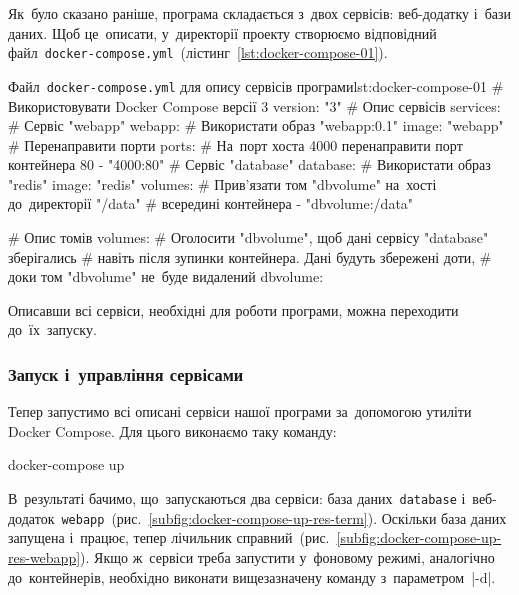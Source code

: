\documentclass[
	a4paper,
	oneside,
	BCOR = 10mm,
	DIV = 12,
	12pt,
	headings = normal,
]{scrartcl}
\newcommand{\filename}[1]{\texttt{#1}}
\newcommand{\progname}[1]{\texttt{#1}}
\begin{document}
					Як~було сказано раніше, програма складається з~двох сервісів: веб-додатку і~бази даних. Щоб це~описати, у~директорії проекту створюємо відповідний файл~\filename{\textenglish{docker-compose.yml}}~(лістинг~\ref{lst:docker-compose-01}).

					\begin{listingdockercompose}{Файл~\filename{\textenglish{docker-compose.yml}} для опису сервісів програми}{lst:docker-compose-01}
            # Використовувати Docker Compose версії 3
            version: "3"
            # Опис сервісів
            services:
              # Сервіс "webapp"
              webapp:
                # Використати образ "webapp:0.1"
                image: "webapp"
                # Перенаправити порти
                ports:
                  # На~порт хоста 4000 перенаправити порт контейнера 80
                  - "4000:80"
              # Сервіс "database"
              database:
                # Використати образ "redis"
                image: "redis"
                volumes:
                  # Прив'язати том "dbvolume" на~хості до~директорії "/data"
                  # всередині контейнера
                  - "dbvolume:/data"

            # Опис томів
            volumes:
              # Оголосити "dbvolume", щоб дані сервісу "database" зберігались
              # навіть після зупинки контейнера. Дані будуть збережені доти,
              # доки том "dbvolume" не~буде видалений
              dbvolume:
					\end{listingdockercompose}
					Описавши всі сервіси, необхідні для роботи програми, можна переходити до~їх~запуску.

				\subsubsection{Запуск і~управління сервісами}
					Тепер запустимо всі описані сервіси нашої програми за~допомогою утиліти \textenglish{Docker Compose}. Для цього виконаємо таку команду:
					\begin{bashterm}
						docker-compose up
					\end{bashterm}
					В~результаті бачимо, що~запускаються два сервіси: база даних~\progname{database} і~веб-додаток~\progname{webapp}~(рис.~\ref{subfig:docker-compose-up-res-term}). Оскільки база даних запущена і~працює, тепер лічильник справний~(рис.~\ref{subfig:docker-compose-up-res-webapp}). Якщо ж~сервіси треба запустити у~фоновому режимі, аналогічно до~контейнерів, необхідно виконати вищезазначену команду з~параметром~\bashinline|-d|.
\end{document}
